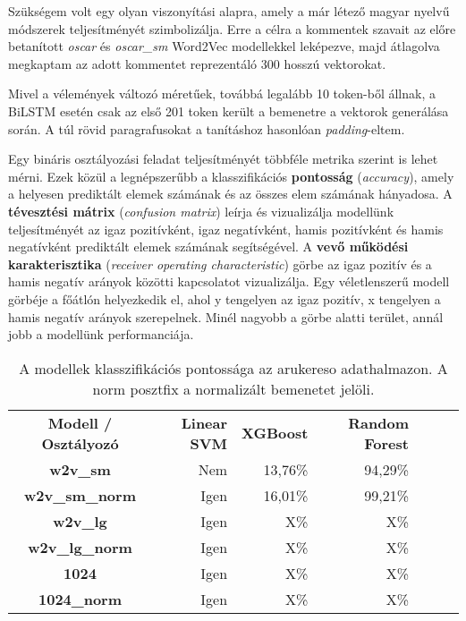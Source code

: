 Szükségem volt egy olyan viszonyítási alapra, amely a már létező magyar nyelvű módszerek teljesítményét szimbolizálja. Erre a célra a kommentek szavait az előre betanított \textit{oscar} és \textit{oscar\_sm} Word2Vec modellekkel leképezve, majd átlagolva megkaptam az adott kommentet reprezentáló 300 hosszú vektorokat.

Mivel a vélemények változó méretűek, továbbá legalább 10 token-ből állnak, a BiLSTM esetén csak az első 201 token került a bemenetre a vektorok generálása során. A túl rövid paragrafusokat a tanításhoz hasonlóan \textit{padding}-eltem.

Egy bináris osztályozási feladat teljesítményét többféle metrika szerint is lehet mérni. Ezek közül a legnépszerűbb a klasszifikációs \textbf{pontosság} (\textit{accuracy}), amely a helyesen prediktált elemek számának és az összes elem számának hányadosa. A \textbf{tévesztési mátrix} (\textit{confusion matrix}) leírja és vizualizálja modellünk teljesítményét az igaz pozitívként, igaz negatívként, hamis pozitívként és hamis negatívként prediktált elemek számának segítségével. A \textbf{vevő működési karakterisztika} (\textit{receiver operating characteristic}) görbe az igaz pozitív és a hamis negatív arányok közötti kapcsolatot vizualizálja. Egy véletlenszerű modell görbéje a főátlón helyezkedik el, ahol y tengelyen az igaz pozitív, x tengelyen a hamis negatív arányok szerepelnek. Minél nagyobb a görbe alatti terület, annál jobb a modellünk performanciája.


\begin{table}[htb]
	\centering
	\begin{tabular}{ | c | r | r | r | r | r | r |}
		\hline
		\multirow{2}{*}{\textbf{Modell / Osztályozó}} & \multirow{2}{*}{\textbf{Linear SVM}} & \multirow{2}{*}{\textbf{XGBoost}} & \multirow{2}{*}{\textbf{Random Forest}} \\
		& & & \\
		\hline \hline		
		\textbf{w2v\_sm} & Nem & 13,76\% & 94,29\% \\
		\hline
		\textbf{w2v\_sm\_norm} & Igen & 16,01\% & 99,21\% \\
		\hline
		\textbf{w2v\_lg} & Igen & X\% & X\% \\
		\hline
		\textbf{w2v\_lg\_norm} & Igen & X\% & X\% \\
		\hline  
		\textbf{1024} & Igen & X\% & X\% \\
		\hline  
		\textbf{1024\_norm} & Igen & X\% & X\% \\
		\hline  
	\end{tabular}
	\caption[A modellek pontossága]{A modellek klasszifikációs pontossága az arukereso adathalmazon. A norm posztfix a normalizált bemenetet jelöli.}
	\label{tab:evaluation}
\end{table}

